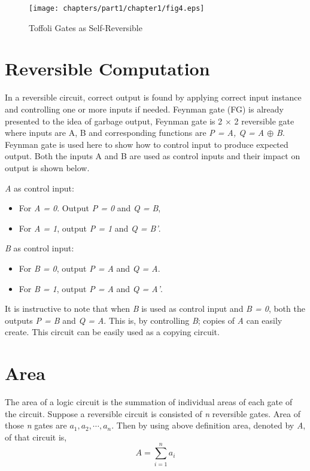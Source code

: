 \begin{figure}[h]
\centering
\texttt{[image: chapters/part1/chapter1/fig4.eps]}
\caption{Toffoli Gates as Self-Reversible}
\label{fig:p1_c1_fig4}
\end{figure}

\section{Reversible Computation}
In a reversible circuit, correct output is found by applying correct input instance and controlling one or more inputs if needed. Feynman gate (FG) is already presented to  the idea of garbage output, Feynman gate is 2 $\times$ 2 reversible gate where inputs are A, B and corresponding functions are \textit{P = A, Q = A $\oplus$ B}. Feynman gate is used here to show how to control input to produce expected output. Both the inputs A and B are used as control inputs and their impact on output is shown below.

\textit{A} as control input:
\begin{itemize}
\item { } For \textit{A = 0}. Output \textit{P = 0 }and \textit{Q = B},
\item { } For \textit{A = 1}, output \textit{P = 1} and \textit{Q = B'}.

\end{itemize}

\textit{B} as control input:
\begin{itemize}
\item For \textit{B = 0}, output \textit{P = A} and \textit{Q = A}.
\item For \textit{B = 1}, output \textit{P = A} and\textit{ Q = A'}.

\end{itemize}

It is instructive to note that when \textit{B} is used as control input and \textit{B = 0}, both the outputs \textit{P = B} and \textit{Q = A}. This is, by controlling \textit{B}; copies of \textit{A} can easily create. This circuit can be easily used as a copying circuit.

\section{Area}
The area of a logic circuit is the summation of individual areas of each gate of the circuit. Suppose a reversible circuit is consisted of \textit{n} reversible gates. Area of those \textit{n} gates are $a_1, a_2,\cdots, a_n$. Then by using above definition area, denoted by \textit{A}, of that circuit is,
\begin{equation*}
A=\sum_{i=1}^{n}a_i
\end{equation*}

